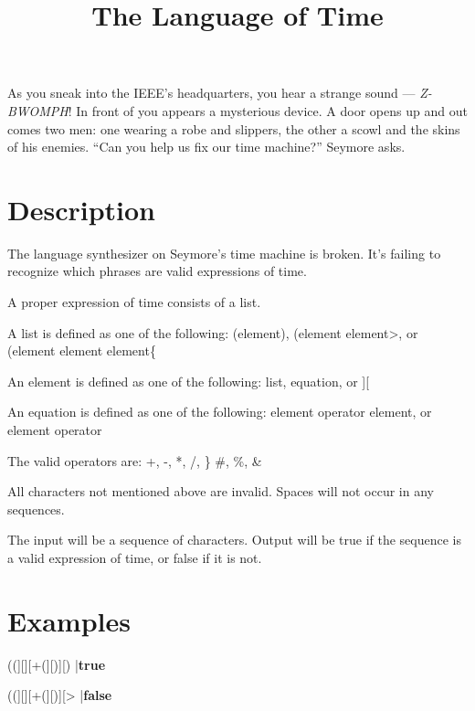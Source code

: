 \documentclass{../codeproblem}
\begin{document}
\title{The Language of Time}

\begin{flavor}
  As you sneak into the IEEE's headquarters, you hear a strange sound --- \emph{Z-BWOMPH}! In front of you appears a mysterious device. A door opens up and out comes two men: one wearing a robe and slippers, the other a scowl and the skins of his enemies. ``Can you help us fix our time machine?'' Seymore asks.
\end{flavor}

\section*{Description}
The language synthesizer on Seymore's time machine is broken. It's failing to recognize which phrases are valid expressions of time.

A proper expression of time consists of a list.

A list is defined as one of the following: (element), (element element>, or (element element element\{

An element is defined as one of the following: list, equation, or ][

An equation is defined as one of the following: element operator element, or element operator

The valid operators are: +, -, *, /, \} \#, \%, \&

All characters not mentioned above are invalid. Spaces will not occur in any sequences.

The input will be a sequence of characters. Output will be true if the sequence is a valid expression of time, or false if it is not.

\section*{Examples}

\begin{example}
(][][][{
|\textbf{true}\end{example}

\begin{example}
((][][+(][)][{})
|\textbf{true}\end{example}

\begin{example}
((][][+(][)][{}>
|\textbf{false}\end{example}


\end{document}
